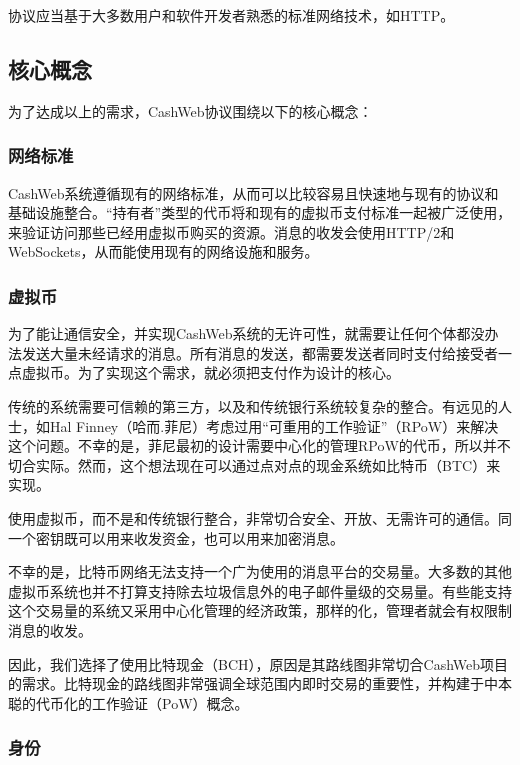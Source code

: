 \documentclass{article}
\begin{document}
协议应当基于大多数用户和软件开发者熟悉的标准网络技术，如HTTP。

\subsection{核心概念}

为了达成以上的需求，CashWeb协议围绕以下的核心概念：

\subsubsection{网络标准}

CashWeb系统遵循现有的网络标准，从而可以比较容易且快速地与现有的协议和基础设施整合。“持有者”类型的代币将和现有的虚拟币支付标准一起被广泛使用，来验证访问那些已经用虚拟币购买的资源。消息的收发会使用HTTP/2\supercite{rfc7540}和WebSockets\supercite{rfc6455}，从而能使用现有的网络设施和服务。

\subsubsection{虚拟币}

为了能让通信安全，并实现CashWeb系统的无许可性，就需要让任何个体都没办法发送大量未经请求的消息。所有消息的发送，都需要发送者同时支付给接受者一点虚拟币。为了实现这个需求，就必须把支付作为设计的核心。

传统的系统需要可信赖的第三方，以及和传统银行系统较复杂的整合。有远见的人士，如Hal Finney（哈而.菲尼）考虑过用“可重用的工作验证”（RPoW）来解决这个问题。不幸的是，菲尼最初的设计需要中心化的管理RPoW的代币，所以并不切合实际。然而，这个想法现在可以通过点对点的现金系统如比特币（BTC）来实现。

使用虚拟币，而不是和传统银行整合，非常切合安全、开放、无需许可的通信。同一个密钥既可以用来收发资金，也可以用来加密消息。

不幸的是，比特币网络无法支持一个广为使用的消息平台的交易量。大多数的其他虚拟币系统也并不打算支持除去垃圾信息外的电子邮件量级的交易量。有些能支持这个交易量的系统又采用中心化管理的经济政策，那样的化，管理者就会有权限制消息的收发。

因此，我们选择了使用比特现金（BCH），原因是其路线图非常切合CashWeb项目的需求。比特现金的路线图非常强调全球范围内即时交易的重要性，并构建于中本聪的代币化的工作验证（PoW）概念。

\subsubsection{身份}
\end{document}

